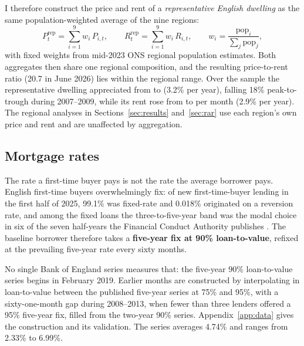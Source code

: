 I therefore construct the price and rent of a \emph{representative English dwelling} as the same population-weighted average of the nine regions:
\begin{equation}
  P^{\text{rep}}_t = \sum_{i=1}^{9} w_i\, P_{i,t}, \qquad
  R^{\text{rep}}_t = \sum_{i=1}^{9} w_i\, R_{i,t}, \qquad
  w_i = \frac{\text{pop}_i}{\sum_j \text{pop}_j},
  \label{eq:representative}
\end{equation}
with fixed weights from mid-2023 ONS regional population estimates. Both aggregates then share one regional composition, and the resulting price-to-rent ratio (20.7 in June 2026) lies within the regional range. Over the sample the representative dwelling appreciated from  to  (3.2\% per year), falling 18\% peak-to-trough during 2007--2009, while its rent rose from  to  per month (2.9\% per year). The regional analyses in Sections~\ref{sec:results} and~\ref{sec:rar} use each region's own price and rent and are unaffected by aggregation.

\subsection{Mortgage rates}
\label{sec:mortgage_rate}

The rate a first-time buyer pays is not the rate the average borrower pays. English first-time buyers overwhelmingly fix: of new first-time-buyer lending in the first half of 2025, 99.1\% was fixed-rate and 0.018\% originated on a reversion rate, and among the fixed loans the three-to-five-year band was the modal choice in six of the seven half-years the Financial Conduct Authority publishes \parencite{fca_psd}. The baseline borrower therefore takes a \textbf{five-year fix at 90\% loan-to-value}, refixed at the prevailing five-year rate every sixty months.

No single Bank of England series measures that: the five-year 90\% loan-to-value series begins in February 2019. Earlier months are constructed by interpolating in loan-to-value between the published five-year series at 75\% and 95\%, with a sixty-one-month gap during 2008--2013, when fewer than three lenders offered a 95\% five-year fix, filled from the two-year 90\% series. Appendix~\ref{app:data} gives the construction and its validation. The series averages 4.74\% and ranges from 2.33\% to 6.99\%.

